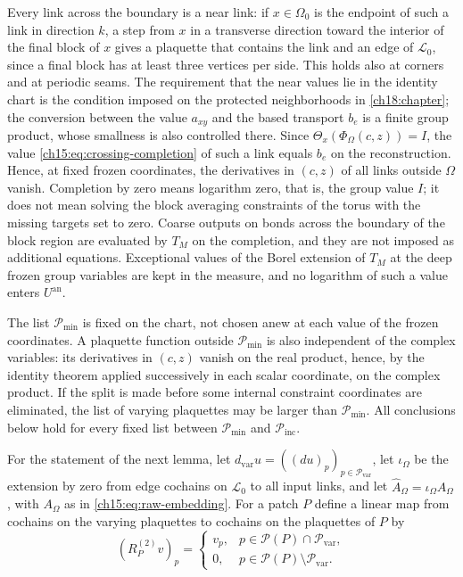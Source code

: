 Every link across the boundary is a near link: if $x\in\Omega_0$ is the endpoint of such a link in direction $k$, a step from $x$ in a transverse direction toward the interior of the final block of $x$ gives a plaquette that contains the link and an edge of $\mathcal L_0$, since a final block has at least three vertices per side. This holds also at corners and at periodic seams. The requirement that the near values lie in the identity chart is the condition imposed on the protected neighborhoods in \cref{ch18:chapter}; the conversion between the value $a_{xy}$ and the based transport $b_e$ is a finite group product, whose smallness is also controlled there. Since $\Theta_x(\Phi_\Omega(c,z))=I$, the value \eqref{ch15:eq:crossing-completion} of such a link equals $b_e$ on the reconstruction. Hence, at fixed frozen coordinates, the derivatives in $(c,z)$ of all links outside $\Omega$ vanish. Completion by zero means logarithm zero, that is, the group value $I$; it does not mean solving the block averaging constraints of the torus with the missing targets set to zero. Coarse outputs on bonds across the boundary of the block region are evaluated by $T_M$ on the completion, and they are not imposed as additional equations. Exceptional values of the Borel extension of $T_M$ at the deep frozen group variables are kept in the measure, and no logarithm of such a value enters $U^{\mathrm{an}}$.

The list $\mathcal P_{\min}$ is fixed on the chart, not chosen anew at each value of the frozen coordinates. A plaquette function outside $\mathcal P_{\min}$ is also independent of the complex variables: its derivatives in $(c,z)$ vanish on the real product, hence, by the identity theorem applied successively in each scalar coordinate, on the complex product. If the split is made before some internal constraint coordinates are eliminated, the list of varying plaquettes may be larger than $\mathcal P_{\min}$. All conclusions below hold for every fixed list between $\mathcal P_{\min}$ and $\mathcal P_{\mathrm{inc}}$.

For the statement of the next lemma, let $d_{\mathrm{var}}u=((du)_p)_{p\in\mathcal P_{\mathrm{var}}}$, let $\iota_\Omega$ be the extension by zero from edge cochains on $\mathcal L_0$ to all input links, and let $\widehat A_\Omega=\iota_\Omega A_\Omega$, with $A_\Omega$ as in \eqref{ch15:eq:raw-embedding}. For a patch $P$ define a linear map from cochains on the varying plaquettes to cochains on the plaquettes of $P$ by
\begin{equation}\label{ch15:eq:varying-restriction}
 (R_P^{(2)}v)_p=
 \begin{cases}
 v_p,&p\in\mathcal P(P)\cap\mathcal P_{\mathrm{var}},\\
 0,&p\in\mathcal P(P)\setminus\mathcal P_{\mathrm{var}}.
 \end{cases}
\end{equation}

